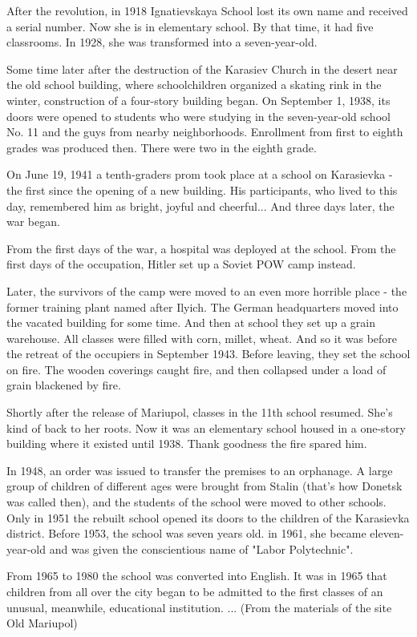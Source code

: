 After the revolution, in 1918 Ignatievskaya School lost its own name and
received a serial number. Now she is in elementary school. By that time, it had
five classrooms. In 1928, she was transformed into a seven-year-old.

Some time later after the destruction of the Karasiev Church in the desert near
the old school building, where schoolchildren organized a skating rink in the
winter, construction of a four-story building began. On September 1, 1938, its
doors were opened to students who were studying in the seven-year-old school
No. 11 and the guys from nearby neighborhoods. Enrollment from first to eighth
grades was produced then. There were two in the eighth grade.

On June 19, 1941 a tenth-graders prom took place at a school on Karasievka -
the first since the opening of a new building. His participants, who lived to
this day, remembered him as bright, joyful and cheerful... And three days
later, the war began.

From the first days of the war, a hospital was deployed at the school. From the
first days of the occupation, Hitler set up a Soviet POW camp instead.

Later, the survivors of the camp were moved to an even more horrible place -
the former training plant named after Ilyich. The German headquarters moved
into the vacated building for some time. And then at school they set up a grain
warehouse. All classes were filled with corn, millet, wheat. And so it was
before the retreat of the occupiers in September 1943. Before leaving, they set
the school on fire. The wooden coverings caught fire, and then collapsed under
a load of grain blackened by fire.

Shortly after the release of Mariupol, classes in the 11th school resumed.
She's kind of back to her roots. Now it was an elementary school housed in a
one-story building where it existed until 1938. Thank goodness the fire spared
him.

In 1948, an order was issued to transfer the premises to an orphanage. A large
group of children of different ages were brought from Stalin (that's how
Donetsk was called then), and the students of the school were moved to other
schools. Only in 1951 the rebuilt school opened its doors to the children of
the Karasievka district. Before 1953, the school was seven years old. in 1961,
she became eleven-year-old and was given the conscientious name of "Labor
Polytechnic".

From 1965 to 1980 the school was converted into English. It was in 1965 that
children from all over the city began to be admitted to the first classes of an
unusual, meanwhile, educational institution. ... (From the materials of the
site Old Mariupol)
